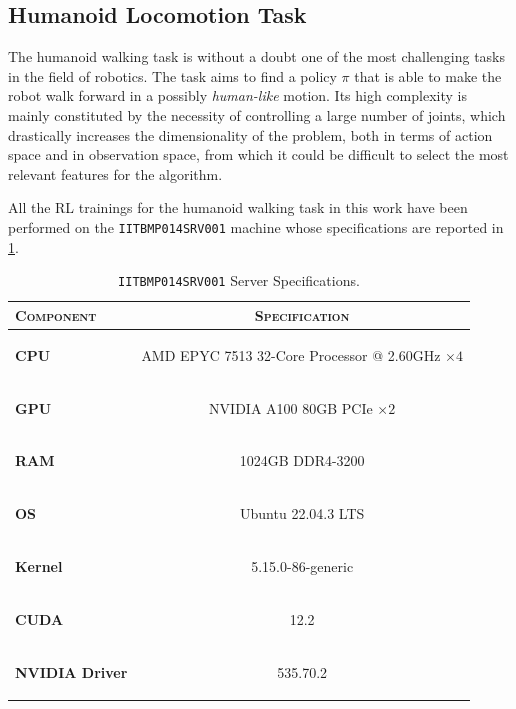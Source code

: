 \subsection{Humanoid Locomotion Task}
The humanoid walking task is without a doubt one of the most challenging tasks in the field of robotics. The task aims to find a policy $\pi$ that is able to make the robot walk forward in a possibly \textit{human-like} motion. Its high complexity is mainly constituted by the necessity of controlling a large number of joints, which drastically increases the dimensionality of the problem, both in terms of action space and in observation space, from which it could be difficult to select the most relevant features for the algorithm.

All the \ac{RL} trainings for the humanoid walking task in this work have been performed on the \texttt{IITBMP014SRV001} machine whose specifications are reported in \cref{tab:srv001}.

\begin{table}[h]
    \centering
    \label{tab:srv001}
    \caption{\texttt{IITBMP014SRV001} Server Specifications.}
    \begin{tabular}[h]{l c}
        \toprule
        \textsc{Component}     & \textsc{Specification}                                                       \\
        \midrule
        \textbf{CPU}           & \begin{small}AMD EPYC 7513 32-Core Processor @ 2.60GHz $\times 4$\end{small} \\
        \textbf{GPU}           & \begin{small}NVIDIA A100 80GB PCIe       $\times 2$             \end{small}  \\
        \textbf{RAM}           & \begin{small}1024GB DDR4-3200                         \end{small}            \\
        \textbf{OS}            & \begin{small}Ubuntu 22.04.3 LTS                       \end{small}            \\
        \textbf{Kernel}        & \begin{small}5.15.0-86-generic                        \end{small}            \\
        \textbf{CUDA}          & \begin{small}12.2                                  \end{small}               \\
        \textbf{NVIDIA Driver} & \begin{small}535.70.2                             \end{small}                \\
        \bottomrule
    \end{tabular}
\end{table}

